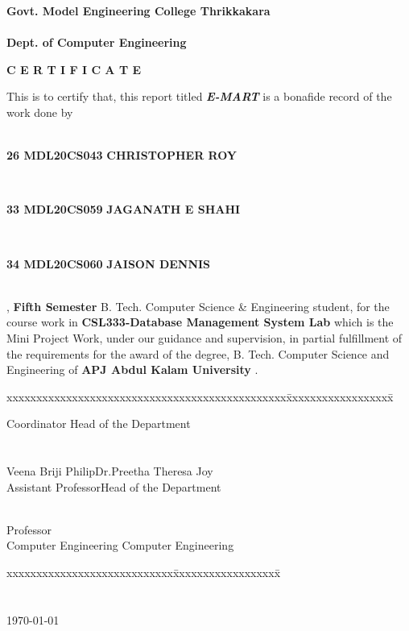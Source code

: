 \documentclass[11pt]{report}
\begin{document}
\begin{titlepage}
\begin{center}
\Large{\textbf{Govt. Model Engineering College Thrikkakara}}\\
\Large{\textbf{\\Dept. of Computer Engineering}}\\
\end{center}
\begin{figure}[h]
\begin{center}
\end{center}
\end{figure}
\begin{center}
\Large{\textbf{C E R T I F I C A T E}}\\
\vspace{.1in}
\end{center}
This is to certify that, this report titled \textbf{\textit {E-MART}} is a bonafide record of the work done by\\
\\ \centerline{{\textbf{26
			MDL20CS043
	}}	\hspace{.1in}	{\textbf{CHRISTOPHER ROY}}}\\ 
\centerline{{\textbf{33
			MDL20CS059
	}}	\hspace{.1in}	{\textbf{JAGANATH E SHAHI}}}\\ 
\centerline{{\textbf{34
			MDL20CS060
	}}	\hspace{.1in}	{\textbf{JAISON DENNIS}}} \\{{, \textbf{Fifth Semester} B. Tech. Computer Science \& Engineering }}
student,  for the course work in \textbf{CSL333-Database Management System Lab} which is the Mini Project Work, under our guidance and supervision, in partial 
 fulfillment of the requirements for the award of the degree, B. Tech. Computer 
Science  and Engineering of \textbf{APJ Abdul Kalam University }.
\vspace{.1in}
\begin{tabbing}
xxxxxxxxxxxxxxxxxxxxxxxxxxxxxxxxxxxxxxxxxxxxxxx\= xxxxxxxxxxxxxxxxxx\= \kill

						Coordinator	\>Head of the Department
\\
\\
\\
  Veena Briji Philip\>Dr.Preetha Theresa Joy\\
	Assistant Professor\>Head of the Department
	
	 \\
	 \>Professor\\
Computer Engineering	\>	Computer Engineering
\end{tabbing}
\vspace{.08in}
%
\begin{tabbing}
xxxxxxxxxxxxxxxxxxxxxxxxxxxx\= xxxxxxxxxxxxxxxxxx\= \kill
			 \\
\\
\\
\today
\end{tabbing}
\end{titlepage}
\end{document}
